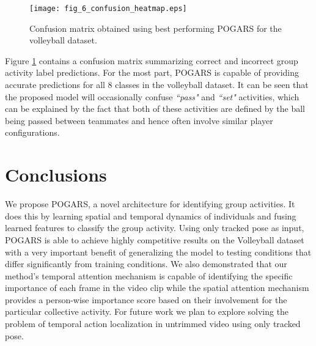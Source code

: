 \documentclass[a4paper,fleqn]{cas-dc}
\begin{document}
\begin{figure}[pos=t]
  \centering
  \texttt{[image: fig\_6\_confusion\_heatmap.eps]}
  \caption{Confusion matrix obtained using best performing POGARS for the volleyball dataset.}
  \label{fig:confusion-matrix}
\end{figure}

Figure \ref{fig:confusion-matrix} contains a confusion matrix summarizing correct and incorrect group activity label predictions.
For the most part, POGARS is capable of providing accurate predictions for all 8 classes in the volleyball dataset. 
It can be seen that the proposed model will occasionally confuse \textit{``pass"} and \textit{``set"} activities, 
which can be explained by the fact that both of these activities are defined by the ball being passed between teammates and hence often involve similar player configurations.

\section{Conclusions}
\label{sec:conclusions}

We propose POGARS, a novel architecture for identifying group activities. 
It does this by learning spatial and temporal dynamics of individuals and fusing learned features to classify the group activity. 
Using only tracked pose as input, POGARS is able to achieve highly competitive results on the Volleyball dataset with a very important benefit of generalizing the model to testing conditions that differ significantly from training conditions. 
We also demonstrated that our method's temporal attention mechanism is capable of identifying the specific importance of each frame in the video clip while the spatial attention mechanism provides a person-wise importance score based on their involvement for the particular collective activity. 
For future work we plan to explore solving the problem of temporal action localization in untrimmed video using only tracked pose. 




\end{document}
